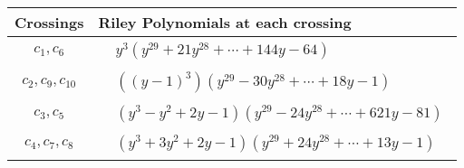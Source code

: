 \documentclass[1p]{elsarticle_modified}
\theoremstyle{definition}
\begin{document}
\begin{tabular}{m{50pt}|m{274pt}}
Crossings & \hspace{64pt}Riley Polynomials at each crossing \\
\hline $$\begin{aligned}c_{1},c_{6}\end{aligned}$$&$\begin{aligned}
&y^3(y^{29}+21 y^{28}+\cdots+144 y-64)
\end{aligned}$\\
\hline $$\begin{aligned}c_{2},c_{9},c_{10}\end{aligned}$$&$\begin{aligned}
&((y-1)^3)(y^{29}-30 y^{28}+\cdots+18 y-1)
\end{aligned}$\\
\hline $$\begin{aligned}c_{3},c_{5}\end{aligned}$$&$\begin{aligned}
&(y^3- y^2+2 y-1)(y^{29}-24 y^{28}+\cdots+621 y-81)
\end{aligned}$\\
\hline $$\begin{aligned}c_{4},c_{7},c_{8}\end{aligned}$$&$\begin{aligned}
&(y^3+3 y^2+2 y-1)(y^{29}+24 y^{28}+\cdots+13 y-1)
\end{aligned}$\\
\hline
\end{tabular}
\vskip 2pc
\end{document}
